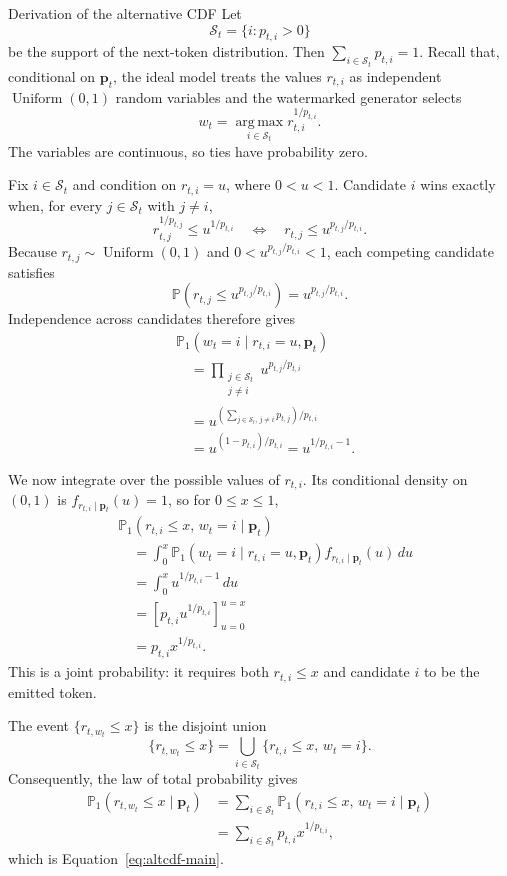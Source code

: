 \documentclass[11pt]{article}
\DeclareRobustCommand{\iperpaper}[2]{%
  \begingroup
  \hypersetup{pdfborder=0 0 0}%
  \href{iperpaper:#1}{{\color{iperpaperlink}#2}}%
  \endgroup
}
\def\iperpaper#1#2{#2}%
\newcommand{\U}{\operatorname{Uniform}}
\newcommand{\Pp}{\mathbb{P}}
\newcommand{\argmax}{\operatorname*{arg\,max}}
\begin{document}
\begin{leveltwo}{Derivation of the alternative CDF}
Let
\[
  \mathcal S_t=\{i:p_{t,i}>0\}
\]
be the support of the next-token distribution. Then
$\sum_{i\in\mathcal S_t}p_{t,i}=1$. Recall that, conditional on
$\mathbf p_t$, the ideal model treats the values $r_{t,i}$ as independent
$\iperpaper{uniform_symbol}{\U}(0,1)$ random variables and the watermarked generator selects
\[
  w_t=\iperpaper{argmax_symbol}{\argmax}_{i\in\mathcal S_t} r_{t,i}^{1/p_{t,i}}.
\]
The variables are continuous, so ties have probability zero.

Fix $i\in\mathcal S_t$ and condition on $r_{t,i}=u$, where $0<u<1$.
Candidate $i$ wins exactly when, for every $j\in\mathcal S_t$ with $j\ne i$,
\[
  r_{t,j}^{1/p_{t,j}}\le u^{1/p_{t,i}}
  \quad\Longleftrightarrow\quad
  r_{t,j}\le u^{p_{t,j}/p_{t,i}}.
\]
Because $r_{t,j}\sim\iperpaper{uniform_symbol}{\U}(0,1)$ and $0<u^{p_{t,j}/p_{t,i}}<1$, each competing
candidate satisfies
\[
  \Pp\!\left(r_{t,j}\le u^{p_{t,j}/p_{t,i}}\right)
  =u^{p_{t,j}/p_{t,i}}.
\]
Independence across candidates therefore gives
\begin{align*}
&\Pp_1(w_t=i\mid r_{t,i}=u,\mathbf p_t)\\
&\quad=\prod_{\substack{j\in\mathcal S_t\\j\ne i}}
u^{p_{t,j}/p_{t,i}}\\
&\quad=u^{\left(\sum_{j\in\mathcal S_t,\,j\ne i}p_{t,j}\right)/p_{t,i}}\\
&\quad=u^{(1-p_{t,i})/p_{t,i}}
=u^{1/p_{t,i}-1}.
\end{align*}

We now integrate over the possible values of $r_{t,i}$. Its conditional
density on $(0,1)$ is $f_{r_{t,i}\mid\mathbf p_t}(u)=1$, so for
$0\le x\le1$,
\begin{align*}
&\Pp_1(r_{t,i}\le x,\,w_t=i\mid\mathbf p_t)\\
&\quad=\int_0^x
  \Pp_1(w_t=i\mid r_{t,i}=u,\mathbf p_t)
  f_{r_{t,i}\mid\mathbf p_t}(u)\,du\\
&\quad=\int_0^x u^{1/p_{t,i}-1}\,du\\
&\quad=\left[p_{t,i}u^{1/p_{t,i}}\right]_{u=0}^{u=x}\\
&\quad=p_{t,i}x^{1/p_{t,i}}.
\end{align*}
This is a joint probability: it requires both $r_{t,i}\le x$ and candidate
$i$ to be the emitted token.

The event $\{r_{t,w_t}\le x\}$ is the disjoint union
\[
  \{r_{t,w_t}\le x\}
  =\bigcup_{i\in\mathcal S_t}
  \{r_{t,i}\le x,\,w_t=i\}.
\]
Consequently, the law of total probability gives
\begin{align*}
\Pp_1(r_{t,w_t}\le x\mid\mathbf p_t)
&=\sum_{i\in\mathcal S_t}
  \Pp_1(r_{t,i}\le x,\,w_t=i\mid\mathbf p_t)\\
&=\sum_{i\in\mathcal S_t}p_{t,i}x^{1/p_{t,i}},
\end{align*}
which is Equation~\eqref{eq:altcdf-main}.


\end{leveltwo}
\end{document}
